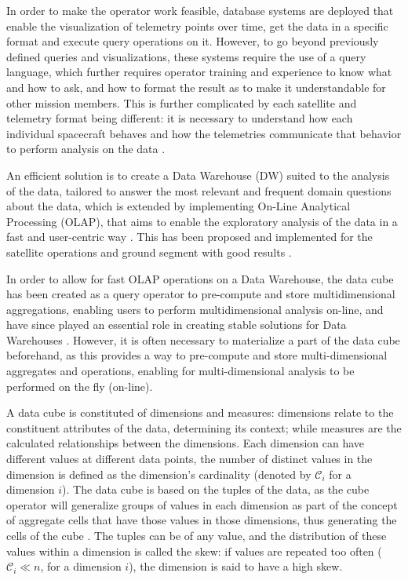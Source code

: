 In order to make the operator work feasible, database systems are deployed that enable the visualization of telemetry points over time, get the data in a specific format and execute query operations on it.
However, to go beyond previously defined queries and visualizations, these systems require the use of a query language, which further requires operator training and experience to know what and how to ask, and how to format the result as to make it understandable for other mission members.
This is further complicated by each satellite and telemetry format being different: it is necessary to understand how each individual spacecraft behaves and how the telemetries communicate that behavior to perform analysis on the data \cite{uhligSpacecraftOperations2015}.

An efficient solution is to create a Data Warehouse (DW) suited to the analysis of the data, tailored to answer the most relevant and frequent domain questions about the data, which is extended by implementing On-Line Analytical Processing (OLAP), that aims to enable the exploratory analysis of the data in a fast and user-centric way \cite{hanDataMiningConcepts2011,viswanathanUsercentricSpatialData2014}.
This has been proposed and implemented for the satellite operations and ground segment with good results \cite{adamskiDataAnalyticsLarge2016,yvernesCopernicusGroundSegment2018}.

In order to allow for fast OLAP operations on a Data Warehouse, the data cube has been created as a query operator to pre-compute and store multidimensional aggregations, enabling users to perform multidimensional analysis on-line, and have since played an essential role in creating stable solutions for Data Warehouses \cite{grayDataCubeRelational1996}.
However, it is often necessary to materialize a part of the data cube beforehand, as this provides a way to pre-compute and store multi-dimensional aggregates and operations, enabling for multi-dimensional analysis to be performed on the fly (on-line).

A data cube is constituted of dimensions and measures: dimensions relate to the constituent attributes of the data, determining its context; while measures are the calculated relationships between the dimensions.
Each dimension can have different values at different data points, the number of distinct values in the dimension is defined as the dimension's cardinality (denoted by \(\mathcal{C}_i\) for a dimension \(i\)).
The data cube is based on the tuples of the data, as the cube operator will generalize groups of values in each dimension as part of the concept of aggregate cells that have those values in those dimensions, thus generating the cells of the cube \cite{hanDataMiningConcepts2011}.
The tuples can be of any value, and the distribution of these values within a dimension is called the skew: if values are repeated too often (\(\mathcal{C}_i \ll n\), for a dimension \(i\)), the dimension is said to have a high skew.

